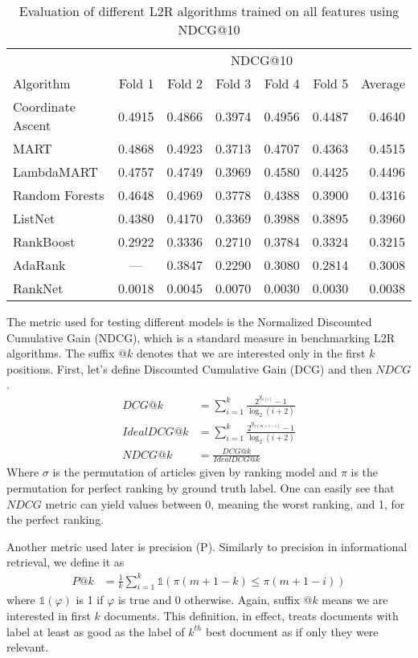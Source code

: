 \begin{table*}[t]
\caption{Evaluation of different L2R algorithms trained on all features using NDCG@10}
\centering
\label{tab:eval_ndcg@10}
\begin{tabular}{lrrrrrr}
\toprule
& \multicolumn{6}{c}{NDCG@10} \\
\cmidrule{2-7}
Algorithm & Fold 1 & Fold 2 & Fold 3 & Fold 4 & Fold 5 & Average \\
\midrule
Coordinate Ascent & 0.4915 & 0.4866 & 0.3974 & 0.4956 & 0.4487 & 0.4640 \\
MART & 0.4868 & 0.4923 & 0.3713 & 0.4707 & 0.4363 & 0.4515 \\
LambdaMART & 0.4757 & 0.4749 & 0.3969 & 0.4580 & 0.4425 & 0.4496 \\
Random Forests & 0.4648 & 0.4969 & 0.3778 & 0.4388 & 0.3900 & 0.4316 \\
ListNet & 0.4380 & 0.4170 & 0.3369 & 0.3988 & 0.3895 & 0.3960 \\
RankBoost & 0.2922 & 0.3336 & 0.2710 & 0.3784 & 0.3324 & 0.3215 \\
AdaRank & \multicolumn{1}{c}{---} & 0.3847 & 0.2290 & 0.3080 & 0.2814 & 0.3008 \\
RankNet & 0.0018 & 0.0045 & 0.0070 & 0.0030 & 0.0030 & 0.0038\\
\bottomrule
\end{tabular}
\end{table*}

The metric used for testing different models is the Normalized Discounted Cumulative Gain (NDCG), which is a standard measure in benchmarking L2R algorithms. The suffix $@k$ denotes that we are interested only in the first $k$ positions. First, let's define Discounted Cumulative Gain (DCG) and then $NDCG$.
\begin{align}
DCG@k &= \sum_{i = 1}^{k} \frac{2^{y_{\sigma(i)}}-1}{\log_{2}(i+2)}
\label{eq:dcg} \\
IdealDCG@k &= \sum_{i = 1}^{k} \frac{2^{y_{\pi(m+1-i)}}-1}{\log_{2}(i+2)} 
\label{eq:idealdcg} \\
NDCG@k &= \frac{DCG@k}{IdealDCG@k}
\label{eq:ndcg}
\end{align}
Where $\sigma$ is the permutation of articles given by ranking model and $\pi$ is the permutation for perfect ranking by ground truth label. One can easily see that $NDCG$ metric can yield values between 0, meaning the worst ranking, and 1, for the perfect ranking.

Another metric used later is precision (P). Similarly to precision in informational retrieval, we define it as
\begin{align}
P@k &= \frac{1}{k} \sum_{i = 1}^{k} \mathbb{1}( \pi(m+1-k) \le \pi(m+1-i))
\label{eq:p}
\end{align}
where $\mathbb{1}(\varphi)$ is 1 if $\varphi$ is true and 0 otherwise. Again, suffix $@k$ means we are interested in first $k$ documents. This definition, in effect, treats documents with label at least as good as the label of $k^{th}$ best document as if only they were relevant.

